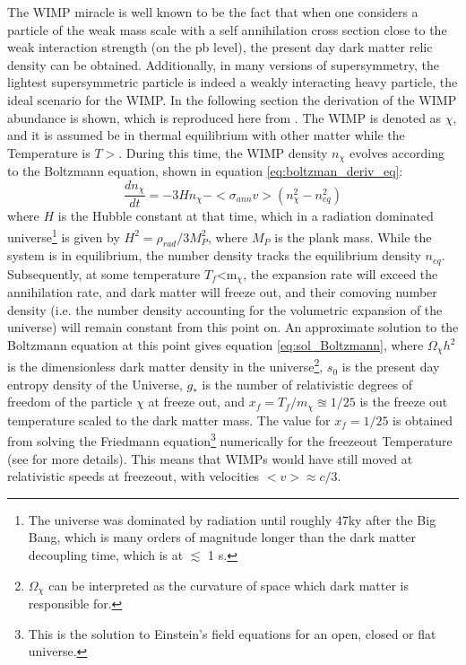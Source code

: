 The WIMP miracle is well known to be the fact that when one considers a particle of the weak mass scale with a self annihilation cross section close to the weak interaction strength (on the pb level), the present day dark matter relic density can be obtained. Additionally, in many versions of supersymmetry, the lightest supersymmetric particle is indeed a weakly interacting heavy particle, the ideal scenario for the WIMP\cite{Supersymmetry_primer}. In the following section the derivation of the WIMP abundance is shown, which is reproduced here from \cite{BAER20151}. The WIMP is denoted as $\chi$, and it is assumed be in thermal equilibrium with other matter while the Temperature is $T>$\dmm . During this time, the WIMP density $n_\chi$ evolves according to the Boltzmann equation, shown in equation \ref{eq:boltzman_deriv_eq}: 
\begin{equation}\label{eq:boltzman_deriv_eq}
    \frac{dn_\chi}{dt} = -3H n_\chi - <\sigma_{ann}v>(n_\chi^2 - n_{eq}^2)
\end{equation}
where $H$ is the Hubble constant at that time, which in a radiation dominated universe\footnote{The universe was dominated by radiation until roughly 47ky after the Big Bang, which is many orders of magnitude longer than the dark matter decoupling time, which is at $\lesssim$ 1 s.} is given by $H^2 = \rho_{rad}/3M^2_P$, where $M_P$ is the plank mass. While the system is in equilibrium, the number density tracks the equilibrium density $n_{eq}$. Subsequently, at some temperature $T_f$<m$_\chi$, the expansion rate will exceed the annihilation rate, and dark matter will freeze out, and their comoving number density (i.e. the number density accounting for the volumetric expansion of the universe) will remain constant from this point on. An approximate solution to the Boltzmann equation at this point gives equation \ref{eq:sol_Boltzmann}, where $\Omega_\chi h^2$ is the dimensionless dark matter density in the universe\footnote{$\Omega_\chi$ can be interpreted as the curvature of space which dark matter is responsible for.}, $s_0$ is the present day entropy density of the Universe, $g_*$ is the number of relativistic degrees of freedom of the particle $\chi$ at freeze out, and $x_f = T_f/m_\chi \approxeq 1/25$ is the freeze out temperature scaled to the dark matter mass. The value for $x_f=1/25$ is obtained from solving the Friedmann equation\footnote{This is the solution to Einstein's field equations for an open, closed or flat universe.} numerically for the freezeout Temperature (see \cite{BAER20151} for more details). This means that WIMPs would have still moved at relativistic speeds at freezeout, with velocities $<v>\approx c/3$. 

